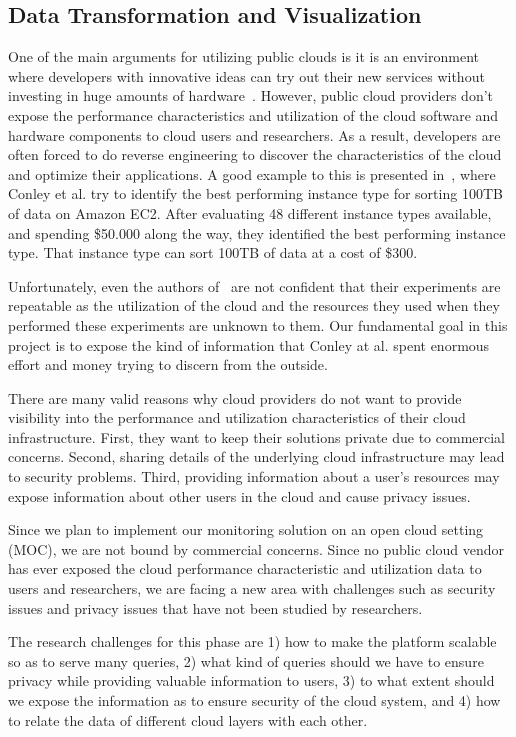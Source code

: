 \subsection{Data Transformation and Visualization} 

One of the main arguments for utilizing public clouds is it is an environment where developers with innovative ideas can try out their new services without investing in huge amounts of hardware~\cite{Armbrust2009}. However, public cloud providers don't expose the performance characteristics and utilization of the cloud software and hardware components to cloud users and researchers. As a result, developers are often forced to do reverse engineering to discover the characteristics of the cloud and optimize their applications. A good example to this is presented in~\cite{conley2015achieving}, where Conley et al. try to identify the best performing instance type for sorting 100TB of data on Amazon EC2. After evaluating 48 different instance types available, and spending \$50.000 along the way, they identified the best performing instance type. That instance type can sort 100TB of data at a cost of \$300. 

Unfortunately, even the authors of~\cite{conley2015achieving} are not confident that their experiments are repeatable as the utilization of the cloud and the resources they used when they performed these experiments are unknown to them. Our fundamental goal in this project is to expose the kind of information that Conley at al. spent enormous effort and money trying to discern from the outside. 

There are many valid reasons why cloud providers do not want to provide visibility into the performance and utilization characteristics of their cloud infrastructure. First, they want to keep their solutions private due to commercial concerns. Second, sharing details of the underlying cloud infrastructure may lead to security problems. Third, providing information about a user's resources may expose information about other users in the cloud and cause privacy issues. 

Since we plan  to implement our monitoring solution on an open cloud setting (MOC), we are not bound by commercial concerns. Since no public cloud vendor has ever exposed the cloud performance characteristic and utilization data to users and researchers, we are facing a new area with challenges such as security issues and privacy issues that have not been studied by researchers.

The research challenges for this phase are 1) how to make the platform scalable so as to serve many queries, 2) what kind of queries should we have to ensure privacy while providing valuable information to users, 3) to what extent should we expose the information as to ensure security of the cloud system, and 4) how to relate the data of different cloud layers with each other. 


